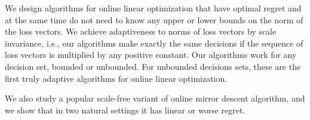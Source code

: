 We design algorithms for online linear optimization that have optimal regret
and at the same time do not need to know any upper or lower bounds on the norm
of the loss vectors.  We achieve adaptiveness to norms of loss vectors by scale
invariance, i.e., our algorithms make exactly the same decisions if the
sequence of loss vectors is multiplied by any positive constant.  Our
algorithms work for any decision set, bounded or unbounded.  For unbounded
decisions sets, these are the first truly adaptive algorithms for online linear
optimization.

We also study a popular scale-free variant of online mirror descent algorithm,
and we show that in two natural settings it has linear or worse regret.
